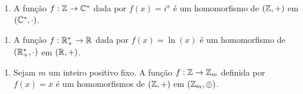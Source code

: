 \documentclass{beamer}
\begin{document}
    \begin{frame}
        \begin{exemplos}
            \begin{enumerate}[label={\arabic*})]
                \item A função $f : \mathbb{Z} \to \mathbb{C}^*$ \pause dada por $f(x) = i^x$ \pause é um homomorfismo de $(\mathbb{Z}, +)$ \pause em $(\mathbb{C}^*, \cdot)$.
                \seti
            \end{enumerate}

            \vspace{2cm}
        \end{exemplos}
    \end{frame}
    \begin{frame}
        \begin{exemplos}
            \begin{enumerate}[label={\arabic*})]
                \conti

                \item A função $f : \mathbb{R}^*_+ \to \mathbb{R}$ \pause dada por $f(x) = \ln(x)$ \pause é um homomorfismo de $(\mathbb{R}^*_+, \cdot)$ \pause em $(\mathbb{R}, +)$.
                \seti
            \end{enumerate}
            \vspace{2cm}
        \end{exemplos}
    \end{frame}
    \begin{frame}
        \begin{exemplos}
            \begin{enumerate}[label={\arabic*})]
                \conti

                \item Sejam $m$ um inteiro positivo fixo. \pause A função $f: \mathbb{Z} \to \mathbb{Z}_m$ \pause definida por $f(x) = \overline{x}$ \pause é um homomorfismos de $(\mathbb{Z}, +)$ \pause em $(\mathbb{Z}_m, \oplus)$.
                \seti
            \end{enumerate}
            \vspace{2cm}
        \end{exemplos}
    \end{frame}
\end{document}
